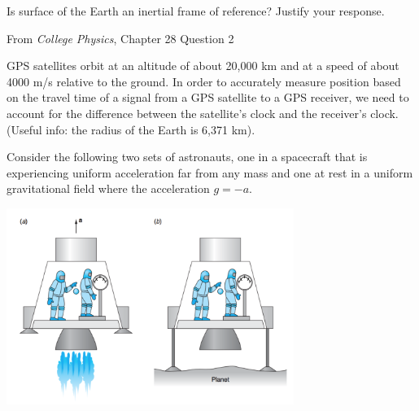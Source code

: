 \documentclass[12pt]{exam}
\begin{document}
\begin{questions}
\question Is surface of the Earth an inertial frame of reference? Justify your response.

From \textit{College Physics}, Chapter 28 Question 2
\vspace{0.75in}

\question GPS satellites orbit at an altitude of about 20,000 km and at a speed of about 4000 m/s relative to the ground. In order to accurately measure position based on the travel time of a signal from a GPS satellite to a GPS receiver, we need to account for the difference between the satellite's clock and the receiver's clock. (Useful info: the radius of the Earth is 6,371 km).

\clearpage
\question
Consider the following two sets of astronauts, one in a spacecraft that is experiencing uniform acceleration far from any mass and one at rest in a uniform gravitational field where the acceleration $g = -a$.

\begin{center}
				\includegraphics[width=0.7\textwidth]{../images/coop12_ep.png}
\end{center}
	\begin{parts}

\end{parts}
\end{questions}
\end{document}

